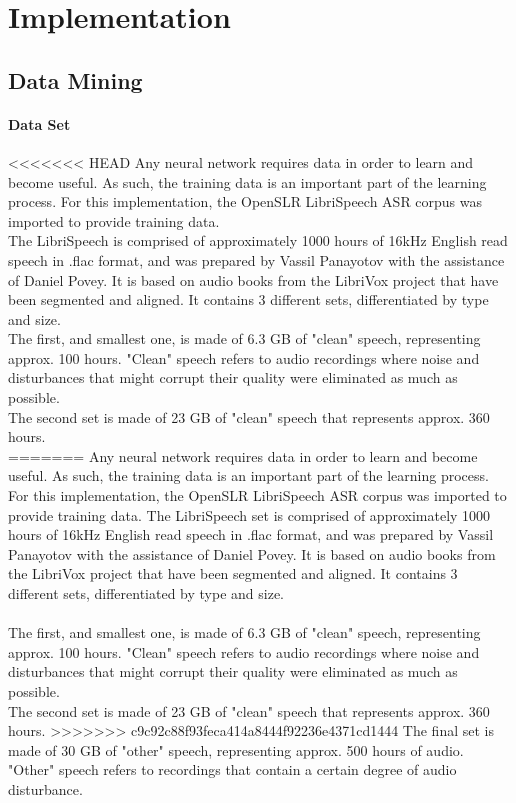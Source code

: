 \chapter{Implementation}\label{ch:implementation}

\section{Data Mining}
\subsubsection{Data Set}
<<<<<<< HEAD
Any neural network requires data in order to learn and become useful. As such, the training data is an important part of the learning process. For this implementation, the OpenSLR LibriSpeech ASR corpus was imported to provide training data.\\

The LibriSpeech is comprised of approximately 1000 hours of 16kHz English read speech in .flac format, and was prepared by Vassil Panayotov with the assistance of Daniel Povey. It is based on audio books from the LibriVox project that have been segmented and aligned. It contains 3 different sets, differentiated by type and size.\\ 

The first, and smallest one, is made of 6.3 GB of "clean" speech, representing approx. 100 hours. "Clean" speech refers to audio recordings where noise and disturbances that might corrupt their quality were eliminated as much as possible.\\ 

The second set is made of 23 GB of "clean" speech that represents approx. 360 hours.\\

=======
Any neural network requires data in order to learn and become useful. As such, the training data is an important part of the learning process. For this implementation, the OpenSLR LibriSpeech ASR corpus was imported to provide training data.
The LibriSpeech set is comprised of approximately 1000 hours of 16kHz English read speech in .flac format, and was prepared by Vassil Panayotov with the assistance of Daniel Povey. It is based on audio books from the LibriVox project that have been segmented and aligned. It contains 3 different sets, differentiated by type and size.\\\\
The first, and smallest one, is made of 6.3 GB of "clean" speech, representing approx. 100 hours. "Clean" speech refers to audio recordings where noise and disturbances that might corrupt their quality were eliminated as much as possible.\\ 
The second set is made of 23 GB of "clean" speech that represents approx. 360 hours.
>>>>>>> c9c92c88f93feca414a8444f92236e4371cd1444
The final set is made of 30 GB of "other" speech, representing approx. 500 hours of audio. "Other" speech refers to recordings that contain a certain degree of audio disturbance.\\

